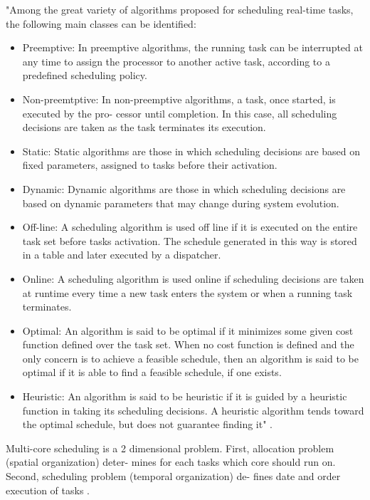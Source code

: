 \documentclass[conference]{IEEEtran}
\begin{document}
"Among the great variety of algorithms proposed for scheduling real-time tasks, the following main classes can be identified:
\begin{itemize}
    \item Preemptive: In preemptive algorithms, the running task can be interrupted at any time to assign the processor to another active task, according to a predefined scheduling policy.
    \item Non-preemtptive: In non-preemptive algorithms, a task, once started, is executed by the pro- cessor until completion. In this case, all scheduling decisions are taken as the task terminates its execution.
    \item Static: Static algorithms are those in which scheduling decisions are based on fixed parameters, assigned to tasks before their activation.
    \item Dynamic: Dynamic algorithms are those in which scheduling decisions are based on dynamic parameters that may change during system evolution.
    \item Off-line: A scheduling algorithm is used off line if it is executed on the entire task set before tasks activation. The schedule generated in this way is stored in a table and later executed by a dispatcher.
    \item Online: A scheduling algorithm is used online if scheduling decisions are taken at runtime every time a new task enters the system or when a running task terminates.
    \item Optimal: An algorithm is said to be optimal if it minimizes some given cost function defined over the task set. When no cost function is defined and the only concern is to achieve a feasible schedule, then an algorithm is said to be optimal if it is able to find a feasible schedule, if one exists.
    \item Heuristic: An algorithm is said to be heuristic if it is guided by a heuristic function in taking its scheduling decisions. A heuristic algorithm tends toward the optimal schedule, but does not guarantee finding it" \cite{butazo99}.
\end{itemize}

Multi-core scheduling is a 2 dimensional problem. First, allocation problem (spatial organization) deter- mines for each tasks which core should run on. Second, scheduling problem (temporal organization) de- fines date and order execution of tasks \cite{AbdallahGB24}.
\end{document}
